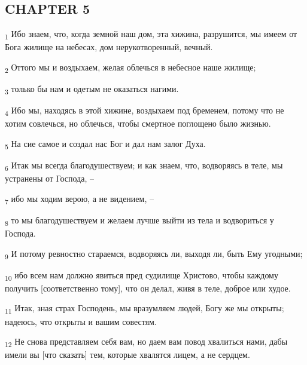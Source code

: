 \subsection{CHAPTER 5}
\begin{tcolorbox}
\textsubscript{1} Ибо знаем, что, когда земной наш дом, эта хижина, разрушится, мы имеем от Бога жилище на небесах, дом нерукотворенный, вечный.
\end{tcolorbox}
\begin{tcolorbox}
\textsubscript{2} Оттого мы и воздыхаем, желая облечься в небесное наше жилище;
\end{tcolorbox}
\begin{tcolorbox}
\textsubscript{3} только бы нам и одетым не оказаться нагими.
\end{tcolorbox}
\begin{tcolorbox}
\textsubscript{4} Ибо мы, находясь в этой хижине, воздыхаем под бременем, потому что не хотим совлечься, но облечься, чтобы смертное поглощено было жизнью.
\end{tcolorbox}
\begin{tcolorbox}
\textsubscript{5} На сие самое и создал нас Бог и дал нам залог Духа.
\end{tcolorbox}
\begin{tcolorbox}
\textsubscript{6} Итак мы всегда благодушествуем; и как знаем, что, водворяясь в теле, мы устранены от Господа, --
\end{tcolorbox}
\begin{tcolorbox}
\textsubscript{7} ибо мы ходим верою, а не видением, --
\end{tcolorbox}
\begin{tcolorbox}
\textsubscript{8} то мы благодушествуем и желаем лучше выйти из тела и водвориться у Господа.
\end{tcolorbox}
\begin{tcolorbox}
\textsubscript{9} И потому ревностно стараемся, водворяясь ли, выходя ли, быть Ему угодными;
\end{tcolorbox}
\begin{tcolorbox}
\textsubscript{10} ибо всем нам должно явиться пред судилище Христово, чтобы каждому получить [соответственно тому], что он делал, живя в теле, доброе или худое.
\end{tcolorbox}
\begin{tcolorbox}
\textsubscript{11} Итак, зная страх Господень, мы вразумляем людей, Богу же мы открыты; надеюсь, что открыты и вашим совестям.
\end{tcolorbox}
\begin{tcolorbox}
\textsubscript{12} Не снова представляем себя вам, но даем вам повод хвалиться нами, дабы имели вы [что сказать] тем, которые хвалятся лицем, а не сердцем.
\end{tcolorbox}
